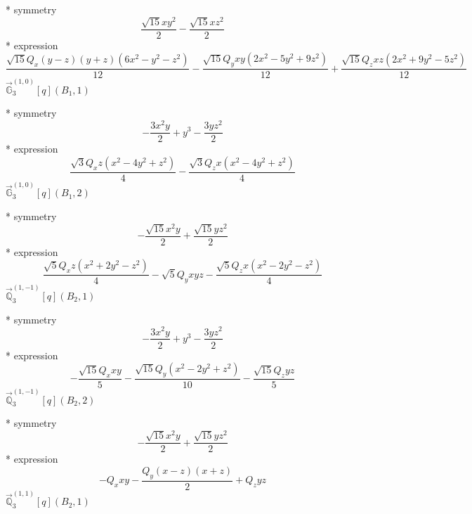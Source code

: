 \documentclass[fleqn,8pt]{jsarticle}
\begin{document}
\noindent\quad ** symmetry
\begin{dmath*}
\frac{\sqrt{15} x y^{2}}{2} - \frac{\sqrt{15} x z^{2}}{2}
\end{dmath*}
\noindent\quad ** expression
\begin{dmath*}
\frac{\sqrt{15} Q_{x} \left(y - z\right) \left(y + z\right) \left(6 x^{2} - y^{2} - z^{2}\right)}{12} - \frac{\sqrt{15} Q_{y} x y \left(2 x^{2} - 5 y^{2} + 9 z^{2}\right)}{12} + \frac{\sqrt{15} Q_{z} x z \left(2 x^{2} + 9 y^{2} - 5 z^{2}\right)}{12}
\end{dmath*}
\noindent\quad $\vec{\mathbb{G}}_{3}^{(1,0)}[q](B_{1},1)$

\noindent\quad ** symmetry
\begin{dmath*}
- \frac{3 x^{2} y}{2} + y^{3} - \frac{3 y z^{2}}{2}
\end{dmath*}
\noindent\quad ** expression
\begin{dmath*}
\frac{\sqrt{3} Q_{x} z \left(x^{2} - 4 y^{2} + z^{2}\right)}{4} - \frac{\sqrt{3} Q_{z} x \left(x^{2} - 4 y^{2} + z^{2}\right)}{4}
\end{dmath*}
\noindent\quad $\vec{\mathbb{G}}_{3}^{(1,0)}[q](B_{1},2)$

\noindent\quad ** symmetry
\begin{dmath*}
- \frac{\sqrt{15} x^{2} y}{2} + \frac{\sqrt{15} y z^{2}}{2}
\end{dmath*}
\noindent\quad ** expression
\begin{dmath*}
\frac{\sqrt{5} Q_{x} z \left(x^{2} + 2 y^{2} - z^{2}\right)}{4} - \sqrt{5} Q_{y} x y z - \frac{\sqrt{5} Q_{z} x \left(x^{2} - 2 y^{2} - z^{2}\right)}{4}
\end{dmath*}
\noindent\quad $\vec{\mathbb{Q}}_{3}^{(1,-1)}[q](B_{2},1)$

\noindent\quad ** symmetry
\begin{dmath*}
- \frac{3 x^{2} y}{2} + y^{3} - \frac{3 y z^{2}}{2}
\end{dmath*}
\noindent\quad ** expression
\begin{dmath*}
- \frac{\sqrt{15} Q_{x} x y}{5} - \frac{\sqrt{15} Q_{y} \left(x^{2} - 2 y^{2} + z^{2}\right)}{10} - \frac{\sqrt{15} Q_{z} y z}{5}
\end{dmath*}
\noindent\quad $\vec{\mathbb{Q}}_{3}^{(1,-1)}[q](B_{2},2)$

\noindent\quad ** symmetry
\begin{dmath*}
- \frac{\sqrt{15} x^{2} y}{2} + \frac{\sqrt{15} y z^{2}}{2}
\end{dmath*}
\noindent\quad ** expression
\begin{dmath*}
- Q_{x} x y - \frac{Q_{y} \left(x - z\right) \left(x + z\right)}{2} + Q_{z} y z
\end{dmath*}
\noindent\quad $\vec{\mathbb{Q}}_{3}^{(1,1)}[q](B_{2},1)$
\end{document}
